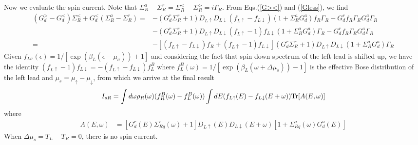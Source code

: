 \documentclass[aps,prb,superscriptaddress]{revtex4-2}
\begin{document}
Now we evaluate the spin current. Note that $\Sigma_{R}^{a} - \Sigma_{R}^{r} = \Sigma_{R}^{<} - \Sigma_{R}^{>} = i\Gamma_{R}$. From Eqs.(\ref{G><}) and (\ref{Gless}), we find
\begin{equation}
\begin{split}
(G_d^>-G_d^< )\Sigma_{R}^< +G_d^< (\Sigma_{R}^a-\Sigma_{R}^r) =& -(G^r_{d}\Sigma^r_{R} +1) D_{L\uparrow}D_{L\downarrow} (f_{L\uparrow} - f_{L\downarrow}) (1+ \Sigma^a_{R} G^a_{d})f_R\Gamma_R + G^r_{d} f_R\Gamma_R G^a_{d}\Gamma_R\\
&-(G^r_{d}\Sigma^r_{R} +1 ) D_{L\uparrow}D_{L\downarrow}(f_{L\uparrow}-1)f_{L\downarrow} (1+ \Sigma^a_{R} G^a_{d})\Gamma_R -G^r_{d} f_R\Gamma_{R} G^a_{d}\Gamma_R\\
=&-[(f_{L\uparrow}-f_{L\downarrow})f_R+(f_{L\uparrow}-1)f_{L\downarrow}] (G^r_{d}\Sigma^r_{R} +1 ) D_{L\uparrow}D_{L\downarrow} (1+ \Sigma^a_{R} G^a_{d})\Gamma_{R} 
\end{split}
\end{equation}
Given $f_{L\sigma}(\epsilon) = 1/[\exp(\beta_L (\epsilon-\mu_\sigma))+1]$ and considering the fact that spin down spectrum of the left lead is shifted up, we have the identity $(f_{L\uparrow}-1)f_{L\downarrow}= -(f_{L\uparrow}-f_{L\downarrow})f^B_L$ where $f^B_L(\omega)= 1/[\exp(\beta_L (\omega+\Delta \mu_s))-1]$ is the effective Bose distribution of the left lead and $\mu_s= \mu_\uparrow-\mu_\downarrow$, from which we arrive at the final result
\begin{eqnarray}
I_{sR} = \int d\omega \rho_R(\omega) (f^B_R(\omega)-f^B_L(\omega))\int dE (f_{L\uparrow}(E)-f_{L\downarrow}(E+\omega)) {\rm Tr}[A(E,\omega)] \label{spin4}
\end{eqnarray}
where
\begin{eqnarray}
A(E,\omega)&=[G^r_{d}(E)\Sigma^r_{Rq}(\omega) +1 ] D_{L\uparrow}(E) D_{L\downarrow}(E+\omega) [1+ \Sigma^a_{Rq}(\omega) G^a_{d}(E)]
\end{eqnarray}
When $\Delta \mu_s = T_L - T_R = 0$, there is no spin current.%
\end{document}
